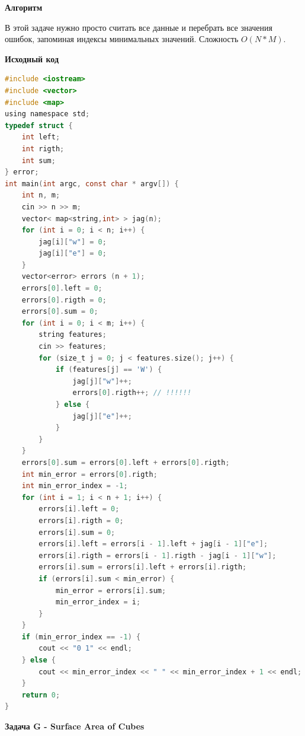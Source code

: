 \documentclass[a4paper,12pt]{article}
\begin{document}
\textbf{{\large Алгоритм}}

В этой задаче нужно просто считать все данные и перебрать все значения ошибок, запоминая индексы минимальных значений. Сложность $O(N * M)$.

\newpage
\textbf{{\large Исходный код}} \\
\begin{lstlisting}[language=C]
#include <iostream>
#include <vector>
#include <map>
using namespace std;
typedef struct {
    int left;
    int rigth;
    int sum;
} error;
int main(int argc, const char * argv[]) {
    int n, m;
    cin >> n >> m;
    vector< map<string,int> > jag(n);
    for (int i = 0; i < n; i++) {
        jag[i]["w"] = 0;
        jag[i]["e"] = 0;
    }
    vector<error> errors (n + 1);
    errors[0].left = 0;
    errors[0].rigth = 0;
    errors[0].sum = 0;
    for (int i = 0; i < m; i++) {
        string features;
        cin >> features;
        for (size_t j = 0; j < features.size(); j++) {
            if (features[j] == 'W') {
                jag[j]["w"]++;
                errors[0].rigth++; // !!!!!!
            } else {
                jag[j]["e"]++;
            }
        }
    }
    errors[0].sum = errors[0].left + errors[0].rigth;
    int min_error = errors[0].rigth;
    int min_error_index = -1;
    for (int i = 1; i < n + 1; i++) {
        errors[i].left = 0;
        errors[i].rigth = 0;
        errors[i].sum = 0;
        errors[i].left = errors[i - 1].left + jag[i - 1]["e"];
        errors[i].rigth = errors[i - 1].rigth - jag[i - 1]["w"];
        errors[i].sum = errors[i].left + errors[i].rigth;   
        if (errors[i].sum < min_error) {
            min_error = errors[i].sum;
            min_error_index = i;
        }
    }
    if (min_error_index == -1) {
        cout << "0 1" << endl;
    } else {
        cout << min_error_index << " " << min_error_index + 1 << endl;
    }   
    return 0;
}
\end{lstlisting}


\newpage
\textbf{{\large Задача G - Surface Area of Cubes}} \\
\end{document}
